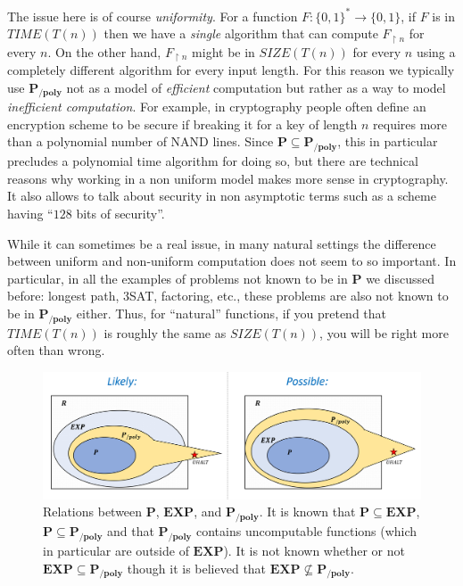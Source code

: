 The issue here is of course \emph{uniformity}. For a function
\(F:\{0,1\}^* \rightarrow \{0,1\}\), if \(F\) is in
\(\ensuremath{\mathit{TIME}}(T(n))\) then we have a \emph{single}
algorithm that can compute \(F_{\upharpoonright n}\) for every \(n\). On
the other hand, \(F_{\upharpoonright n}\) might be in
\(\ensuremath{\mathit{SIZE}}(T(n))\) for every \(n\) using a completely
different algorithm for every input length. For this reason we typically
use \(\mathbf{P_{/poly}}\) not as a model of \emph{efficient}
computation but rather as a way to model \emph{inefficient computation}.
For example, in cryptography people often define an encryption scheme to
be secure if breaking it for a key of length \(n\) requires more than a
polynomial number of NAND lines. Since
\(\mathbf{P} \subseteq \mathbf{P_{/poly}}\), this in particular
precludes a polynomial time algorithm for doing so, but there are
technical reasons why working in a non uniform model makes more sense in
cryptography. It also allows to talk about security in non asymptotic
terms such as a scheme having ``\(128\) bits of security''.

While it can sometimes be a real issue, in many natural settings the
difference between uniform and non-uniform computation does not seem to
so important. In particular, in all the examples of problems not known
to be in \(\mathbf{P}\) we discussed before: longest path, 3SAT,
factoring, etc., these problems are also not known to be in
\(\mathbf{P_{/poly}}\) either. Thus, for ``natural'' functions, if you
pretend that \(\ensuremath{\mathit{TIME}}(T(n))\) is roughly the same as
\(\ensuremath{\mathit{SIZE}}(T(n))\), you will be right more often than
wrong.


\begin{figure}
\centering
\includegraphics[width=\textwidth, height=0.25\paperheight, keepaspectratio]{../figure/PEXPPpolyrelations.png}
\caption{Relations between \(\mathbf{P}\), \(\mathbf{EXP}\), and
\(\mathbf{P_{/poly}}\). It is known that
\(\mathbf{P} \subseteq \mathbf{EXP}\),
\(\mathbf{P} \subseteq \mathbf{P_{/poly}}\) and that
\(\mathbf{P_{/poly}}\) contains uncomputable functions (which in
particular are outside of \(\mathbf{EXP}\)). It is not known whether or
not \(\mathbf{EXP} \subseteq \mathbf{P_{/poly}}\) though it is believed
that \(\mathbf{EXP} \not\subseteq \mathbf{P_{/poly}}\).}
\label{PEXPPpolyrelationsfig}
\end{figure}

